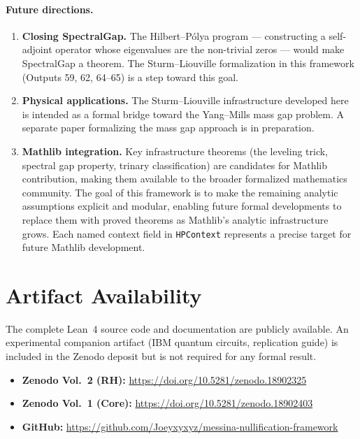 \documentclass[12pt, a4paper]{article}
\theoremstyle{plain}
\theoremstyle{definition}
\newcommand{\lean}[1]{\texttt{#1}}
\newcommand{\Mathlib}{\textsf{Mathlib}}
\begin{document}
\paragraph{Future directions.}
\begin{enumerate}
  \item \textbf{Closing SpectralGap.}
        The Hilbert--P\'olya program --- constructing a self-adjoint operator
        whose eigenvalues are the non-trivial zeros --- would make SpectralGap
        a theorem.
        The Sturm--Liouville formalization in this framework (Outputs 59, 62, 64--65)
        is a step toward this goal.

  \item \textbf{Physical applications.}
        The Sturm--Liouville infrastructure developed here is intended as a
        formal bridge toward the Yang--Mills mass gap problem.
        A separate paper formalizing the mass gap approach is in preparation.

  \item \textbf{Mathlib integration.}
        Key infrastructure theorems (the leveling trick, spectral gap property,
        trinary classification) are candidates for Mathlib contribution,
        making them available to the broader formalized mathematics community.
        The goal of this framework is to make the remaining analytic assumptions
        explicit and modular, enabling future formal developments to replace them
        with proved theorems as \Mathlib{}'s analytic infrastructure grows.
        Each named context field in \lean{HPContext} represents a precise target
        for future Mathlib development.
\end{enumerate}

\section*{Artifact Availability}

The complete Lean~4 source code and documentation are publicly available.
An experimental companion artifact (IBM quantum circuits, replication guide)
is included in the Zenodo deposit but is not required for any formal result.

\begin{itemize}
  \item \textbf{Zenodo Vol.~2 (RH):}
        \url{https://doi.org/10.5281/zenodo.18902325}
  \item \textbf{Zenodo Vol.~1 (Core):}
        \url{https://doi.org/10.5281/zenodo.18902403}
  \item \textbf{GitHub:}
        \url{https://github.com/Joeyxyxyz/messina-nullification-framework}
\end{itemize}
\end{document}
